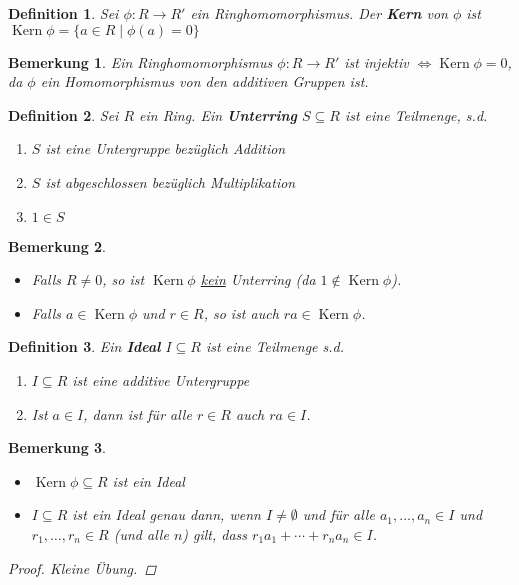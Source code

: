 \documentclass{article}
\theoremstyle{plain}
\newtheorem{definition}{Definition}
\newtheorem{bemerkung}{Bemerkung}
\renewcommand{\ker}{\mathop{\mathrm{Kern}}}
\newcommand{\defn}[1]{\textbf{#1}}
\begin{document}
\begin{definition}
    Sei $\phi\colon R\to R'$ ein Ringhomomorphismus. 
    Der \defn{Kern} von $\phi$ ist
    $\ker\phi=\{a\in R\mid \phi(a)=0\}$
\end{definition}
\begin{bemerkung}
    Ein Ringhomomorphismus $\phi\colon R\to R'$ ist injektiv $\Leftrightarrow \ker\phi = 0$, da $\phi$ ein Homomorphismus von den additiven Gruppen ist.
\end{bemerkung}
\begin{definition}
    Sei $R$ ein Ring. Ein \defn{Unterring} $S\subseteq R$ ist eine Teilmenge, s.d. 
    \begin{enumerate}[label=(\arabic*)]
        \item $S$ ist eine Untergruppe bezüglich Addition
        \item $S$ ist abgeschlossen bezüglich Multiplikation
        \item $1\in S$
    \end{enumerate}
\end{definition}
\begin{bemerkung}
\quad
\begin{itemize}
    \item Falls $R\neq 0$, so ist $\ker\phi$ \underline{kein} Unterring (da $1\notin \ker\phi$).
    \item Falls $a\in \ker\phi$ und $r\in R$, so ist auch $ra\in \ker\phi$.
\end{itemize}
\end{bemerkung}
\begin{definition}
    Ein \defn{Ideal} $I\subseteq R$ ist eine Teilmenge s.d.
    \begin{enumerate}[label=(\roman*)]
        \item $I \subseteq R$ ist eine additive Untergruppe
        \item Ist $a\in I$, dann ist für alle $r\in R$ auch $ra\in I$.
    \end{enumerate}
\end{definition}
\begin{bemerkung}
\begin{itemize}
\quad
    \item $\ker\phi\subseteq R$ ist ein Ideal
    \item $I\subseteq R$ ist ein Ideal genau dann, wenn $I\neq \emptyset$ und für alle $a_1,\ldots,a_n\in I$ und $r_1,\ldots, r_n\in R$ (und alle $n$) gilt, dass $r_1a_1+\cdots+r_na_n\in I$.
\end{itemize}
\begin{proof}
    Kleine Übung.
\end{proof}
\end{bemerkung}
\end{document}
